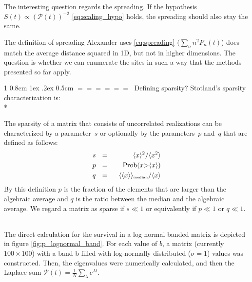 \documentclass[onecolumn,fleqn,notitlepage,secnumarabic]{revtex4}
\makeatletter
\newcommand{\tbox}[1]{\mbox{\tiny #1}}
\newenvironment{fminipage}%
  {\begin{Sbox}\begin{minipage}}%
  {\end{minipage}\end{Sbox}\fbox{\TheSbox}}
\def\section{%
  \@startsection
    {section}%
    {1}%
    {\z@}%
    {0.8cm \@plus1ex \@minus .2ex}%
    {0.5cm}%
    {\Large\bf $=\!=\!=\!=\!=\!=\;$}%
}%
\makeatother
\begin{document}
The interesting question regards the spreading. If the hypothesis $S(t) \propto \left(\mathcal{P}(t)\right)^{-2}$ \eqref{eq:scaling_hypo} holds, the spreading should also stay the same. 

The definition of spreading Alexander uses \eqref{eq:spreading} ($\sum_n n^2 P_n(t)$) does match the average distance squared in 1D, but not in higher dimensions. The question is whether we can enumerate the sites in such a way that the methods presented so far apply.

\section{Defining sparsity?}
Stotland's \cite{Stotland:2010:PRB}  sparsity characterization is:\\*
\begin{fminipage}{\textwidth}
The sparsity of a matrix that consists of 
uncorrelated realizations can be characterized 
by a parameter~$s$ or optionally 
by the parameters~$p$ and~$q$ that 
are defined as follows: 
%
\begin{align}
s \ \ &=& \ \ \langle x \rangle^2 / \langle x^2 \rangle \\
p \ \ &=& \ \ \mbox{Prob}(x {>} \langle x\rangle) \\
q \ \ &=& \ \ \langle\langle x \rangle\rangle_{\tbox{median}}/\langle x \rangle
\end{align}
%
By this definition $p$ is the fraction of the elements that 
are larger than the algebraic average and $q$ is the ratio between the median
and the algebraic average.
We regard a matrix as sparse if $s\ll1$  
or equivalently if $p \ll 1$ or $q \ll 1$. 

\end{fminipage}
\\

The direct calculation for the survival in a log normal banded matrix is depicted in figure \ref{fig:p_lognormal_band}. For each value of $b$, a matrix (currently $100
\times 100$) with a band b filled with log-normally distributed ($\sigma=1$) values was constructed. Then, the eigenvalues were numerically calculated, and then the Laplace sum $\mathcal{P}(t) =\frac{1}{N}\sum_\lambda e^{\lambda t}$.
\end{document}
